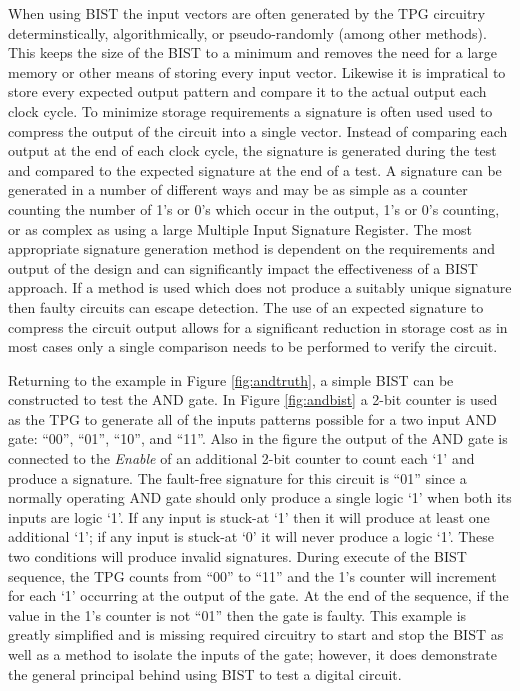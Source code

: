 \documentclass[12pt]{report}
\begin{document}
When using BIST the input vectors are often generated by the TPG circuitry determinstically, algorithmically, or pseudo-randomly (among other methods)\cite{stroud}.  This keeps the size of the BIST to a minimum and removes the need for a large memory or other means of storing every input vector.  Likewise it is impratical to store every expected output pattern and compare it to the actual output each clock cycle.  To minimize storage requirements a signature is often used used to compress the output of the circuit into a single vector.  Instead of comparing each output at the end of each clock cycle, the signature is generated during the test and compared to the expected signature at the end of a test\cite{stroud}\cite{faultdiagnosis}.  A signature can be generated in a number of different ways and may be as simple as a counter counting the number of 1's or 0's which occur in the output, 1's or 0's counting, or as complex as using a large Multiple Input Signature Register\cite{stroud}.  The most appropriate signature generation method is dependent on the requirements and output of the design and can significantly impact the effectiveness of a BIST approach.  If a method is used which does not produce a suitably unique signature then faulty circuits can escape detection\cite{stroud}\cite{faultdiagnosis}.  The use of an expected signature to compress the circuit output allows for a significant reduction in storage cost as in most cases only a single comparison needs to be performed to verify the circuit\cite{faultdiagnosis}.

Returning to the example in Figure \ref{fig:andtruth}, a simple BIST can be constructed to test the AND gate.  In Figure \ref{fig:andbist} a 2-bit counter is used as the TPG to generate all of the inputs patterns possible for a two input AND gate: ``00'', ``01'', ``10'', and ``11''.  Also in the figure the output of the AND gate is connected to the \textit{Enable} of an additional 2-bit counter to count each `1' and produce a signature.  The fault-free signature for this circuit is ``01'' since a normally operating AND gate should only produce a single logic `1' when both its inputs are logic `1'.  If any input is stuck-at `1' then it will produce at least one additional `1'; if any input is stuck-at `0' it will never produce a logic `1'.  These two conditions will produce invalid signatures.  During execute of the BIST sequence, the TPG counts from ``00'' to ``11'' and the 1's counter will increment for each `1' occurring at the output of the gate.  At the end of the sequence, if the value in the 1's counter is not ``01'' then the gate is faulty.  This example is greatly simplified and is missing required circuitry to start and stop the BIST as well as a method to isolate the inputs of the gate; however, it does demonstrate the general principal behind using BIST to test a digital circuit.
\end{document}
